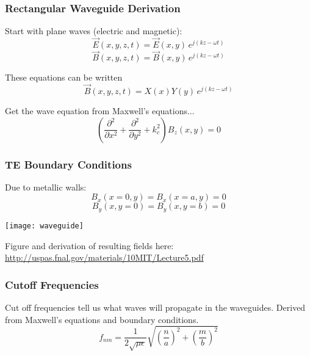 \documentclass[professionalfonts,t]{beamer}
\begin{document}
{\begin{frame}
\frametitle{Rectangular Waveguide Derivation}
		Start with plane waves (electric and magnetic):
	\begin{equation}
	\vec{E}\left(x,y,z,t\right) =\vec{E}\left(x,y\right)\,e^{j\left(kz-\omega t\right)}
	\end{equation}
	\begin{equation}
	\vec{B}\left(x,y,z,t\right) =\vec{B}\left(x,y\right)\,e^{j\left(kz-\omega t\right)}
	\end{equation}
	
	These equations can be written
	\begin{equation}
		\vec{B}\left(x,y,z,t\right) =X\left(x\right)Y\left(y\right)\,e^{j\left(kz-\omega t\right)}
	\end{equation}
	
	Get the wave equation from Maxwell's equations...
	\begin{equation}
		\left(\frac{\partial^2}{\partial x^2} + \frac{\partial^2}{\partial y^2} + k^2_c\right)
		B_z\left(x,y\right)=0
	\end{equation}
\end{frame}


\begin{frame}
\frametitle{TE Boundary Conditions}
\vspace{-0.5em}
	Due to metallic walls:
		\begin{equation}
			B_x\left(x=0,y\right) = B_x\left(x=a,y\right)= 0
		\end{equation}
		\begin{equation}
			B_y\left(x,y=0\right) = B_y\left(x,y=b\right)=0
		\end{equation}
		
\vspace{-1em}

\begin{center}
\texttt{[image: waveguide]}
\end{center}

\vspace{-1.5em}

Figure and derivation of resulting fields here:	
\small\url{http://uspas.fnal.gov/materials/10MIT/Lecture5.pdf}
\end{frame}

\begin{frame}
	\frametitle{Cutoff Frequencies}
	Cut off frequencies tell us what waves will propagate in the waveguides. 
	Derived from Maxwell's equations and boundary conditions.
	\begin{equation}
		f_{nm} = \frac{1}{2\sqrt{\mu \epsilon}}\sqrt{\left(\frac{n}{a}\right)^2+\left(\frac{m}{b}\right)^2}
	\end{equation}
	

\end{frame}}
\end{document}
